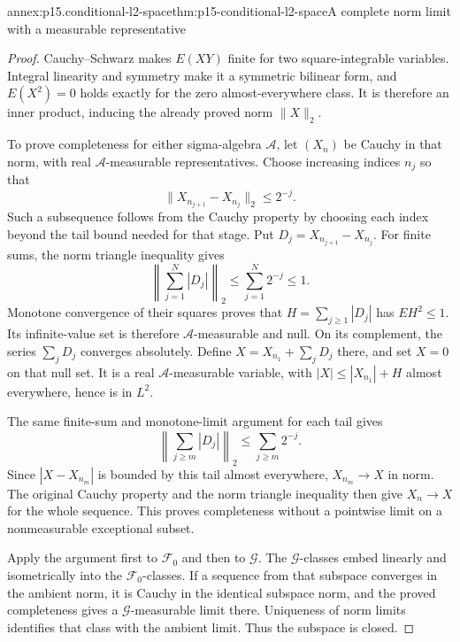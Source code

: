 \begin{annexitem}{annex:p15.conditional-l2-space}{thm:p15-conditional-l2-space}{A complete norm limit with a measurable representative}
\begin{proof}
Cauchy--Schwarz makes \(E(XY)\) finite for two square-integrable
variables. Integral linearity and symmetry make it a symmetric
bilinear form, and \(E(X^2)=0\) holds exactly for the zero
almost-everywhere class. It is therefore an inner product, inducing
the already proved norm \(\|X\|_2\).

To prove completeness for either sigma-algebra \(\mathcal A\), let
\((X_n)\) be Cauchy in that norm, with real \(\mathcal A\)-measurable
representatives. Choose increasing indices \(n_j\) so that
\[
                  \|X_{n_{j+1}}-X_{n_j}\|_2\leq2^{-j}.
\]
Such a subsequence follows from the Cauchy property by choosing each
index beyond the tail bound needed for that stage.
Put \(D_j=X_{n_{j+1}}-X_{n_j}\).
For finite sums, the norm triangle inequality gives
\[
                  \left\|\sum_{j=1}^N|D_j|\right\|_2
                                          \leq\sum_{j=1}^N2^{-j}\leq1.
\]
Monotone convergence of their squares proves that
\(H=\sum_{j\geq1}|D_j|\) has \(EH^2\leq1\).
Its infinite-value set is therefore \(\mathcal A\)-measurable and null.
On its complement, the series \(\sum_jD_j\) converges absolutely.
Define \(X=X_{n_1}+\sum_jD_j\) there, and set \(X=0\) on that null set.
It is a real \(\mathcal A\)-measurable variable, with
\(|X|\leq|X_{n_1}|+H\) almost everywhere, hence is in \(L^2\).

The same finite-sum and monotone-limit argument for each tail gives
\[
                 \left\|\sum_{j\geq m}|D_j|\right\|_2
                                      \leq\sum_{j\geq m}2^{-j}.
\]
Since \(|X-X_{n_m}|\) is bounded by this tail almost everywhere,
\(X_{n_m}\to X\) in norm. The original Cauchy property and the norm
triangle inequality then give \(X_n\to X\) for the whole sequence.
This proves completeness without a pointwise limit on a nonmeasurable
exceptional subset.

Apply the argument first to \(\mathcal F_0\) and then to \(\mathcal G\).
The \(\mathcal G\)-classes embed linearly and isometrically into the
\(\mathcal F_0\)-classes. If a sequence from that subspace converges
in the ambient norm, it is Cauchy in the identical subspace norm,
and the proved completeness gives a \(\mathcal G\)-measurable limit
there. Uniqueness of norm limits identifies that class with the
ambient limit. Thus the subspace is closed.
\end{proof}
\end{annexitem}


